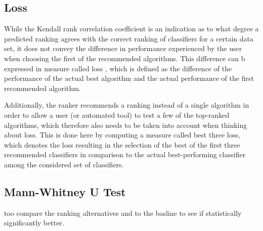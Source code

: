 
\subsection{Loss}
While the Kendall rank correlation coefficient is an indication as to what degree a predicted ranking agrees with the correct ranking of classifiers for a certain data set, it does not convey the difference in performance experienced by the user when choosing the first of the recommended algorithms. This difference can b expressed in measure called loss \cite{DBLP:conf/mldm/LeiteBV12}, which is defined as the difference of the performance of the actual best algorithm and the actual performance of the first recommended algorithm. 

Additionally, the ranker recommends a ranking instead of a single algorithm in order to allow a user (or automated tool) to test a few of the top-ranked algorithms, which therefore also needs to be taken into account when thinking about loss. This is done here by computing a measure called best three loss, which denotes the loss resulting in the selection of the best of the first three recommended classifiers in comparison to the actual best-performing classifier among the considered set of classifiers. 

\subsection{Mann-Whitney U Test}
too compare the ranking alternatives and to the basline to see if statistically significantly better.
